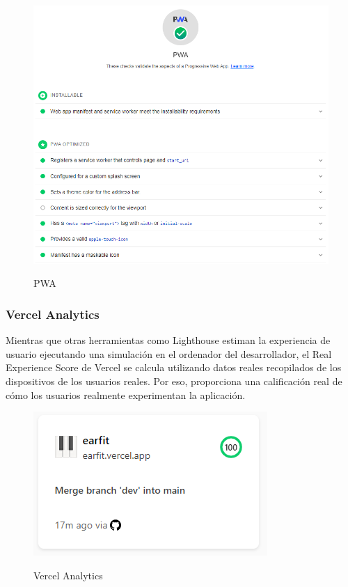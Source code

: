 \documentclass[12pt,twoside,titlepage]{report}
\begin{document}
\begin{figure}[H]
    \centering
    \includegraphics[scale=0.6]{Lighthouse/PWA}
    \label{fig:Lighthouse_PWA}
    \caption{PWA}
\end{figure}

\subsubsection{Vercel Analytics}

Mientras que otras herramientas como Lighthouse estiman la experiencia de usuario ejecutando una simulación en el ordenador del desarrollador, el Real Experience Score de Vercel se calcula utilizando datos reales recopilados de los dispositivos de los usuarios reales. Por eso, proporciona una calificación real de cómo los usuarios realmente experimentan la aplicación.

\begin{figure}[H]
    \centering
    \includegraphics[scale=0.8]{Vercel/VercelAnalyticsResume}
    \label{fig:Vercel_metrics_resume}
    \caption{Vercel Analytics}
\end{figure}
\end{document}
